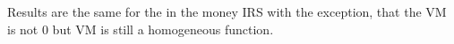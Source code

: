     Results are the same for the in the money IRS with the exception, that
the VM is not 0 but VM is still a homogeneous function.
 
            
            \begin{tcolorbox}[breakable, size=fbox, boxrule=.5pt, pad at break*=1mm, opacityfill=0]
    \begin{center}
    \end{center}
    { \hspace*{\fill} \\}
\end{tcolorbox}
    


